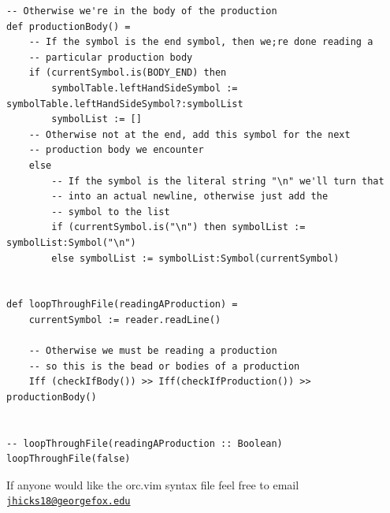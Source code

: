 \documentclass[12pt, letterpaper]{article}
\makeatletter
\newcommand*{\email}[1]{\href{mailto:jhicks18@georgefox.edu}{\nolinkurl{jhicks18@georgefox.edu}} }
\makeatother
\begin{document}
\begin{lstlisting}
-- Otherwise we're in the body of the production
def productionBody() =
    -- If the symbol is the end symbol, then we;re done reading a
    -- particular production body
    if (currentSymbol.is(BODY_END) then
        symbolTable.leftHandSideSymbol := symbolTable.leftHandSideSymbol?:symbolList
        symbolList := []
    -- Otherwise not at the end, add this symbol for the next
    -- production body we encounter
    else
        -- If the symbol is the literal string "\n" we'll turn that
        -- into an actual newline, otherwise just add the
        -- symbol to the list
        if (currentSymbol.is("\n") then symbolList := symbolList:Symbol("\n")
        else symbolList := symbolList:Symbol(currentSymbol)


def loopThroughFile(readingAProduction) =
    currentSymbol := reader.readLine()

    -- Otherwise we must be reading a production
    -- so this is the bead or bodies of a production
    Iff (checkIfBody()) >> Iff(checkIfProduction()) >> productionBody()


-- loopThroughFile(readingAProduction :: Boolean)
loopThroughFile(false)
\end{lstlisting}

\vspace*{\fill}
If anyone would like the orc.vim syntax file feel free to email \email{jhicks18}
\end{document}
